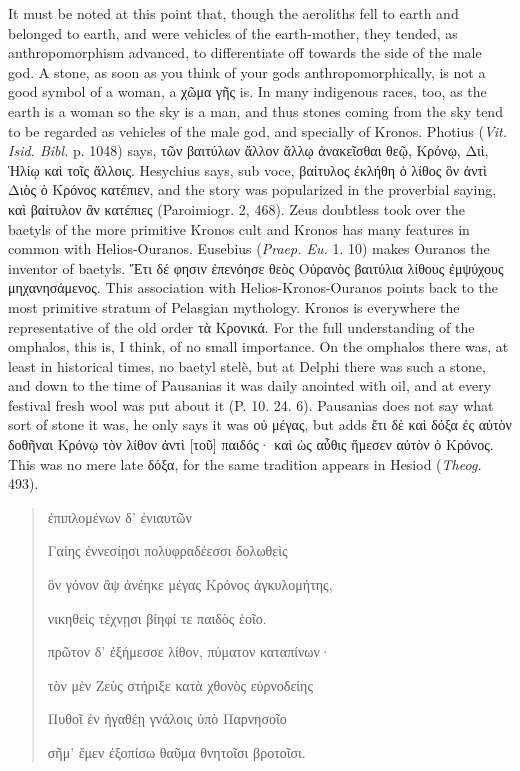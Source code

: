 \documentclass[a4paper, 11pt, oneside, polutonikogreek, english]{article}
\begin{document}
It must be noted at this point that, though the aeroliths fell to earth and belonged to earth, and were vehicles of the earth-mother, they tended, as anthropomorphism advanced, to differentiate off towards the side of the male god. A stone, as soon as you think of your gods anthropomorphically, is not a good symbol of a woman, a χῶμα γῆς is. In many indigenous races, too, as the earth is a woman so the sky is a man, and thus stones coming from the sky tend to be regarded as vehicles of the male god, and specially of Kronos. Photius (\emph{Vit. Isid. Bibl.} p. 1048) says, τῶν βαιτύλων ἄλλον ἄλλῳ ἀνακεῖσθαι θεῷ, Κρόνῳ, Διὶ, Ἡλίῳ καὶ τοῖς ἄλλοις. Hesychius says, sub voce, βαίτυλος ἐκλήθη ὁ λίθος ὃν ἀντὶ Διὸς ὁ Κρόνος κατέπιεν, and the story was popularized in the proverbial saying, καὶ βαίτυλον ἂν κατέπιες (Paroimiogr. 2, 468). Zeus doubtless took over the baetyls of the more primitive Kronos cult and Kronos has many features in common with Helios-Ouranos. Eusebius (\emph{Praep. Eu.} 1. 10) makes Ouranos the inventor of baetyls. Ἔτι δέ φησιν ἐπενόησε θεὸς Οὐρανὸς βαιτύλια λίθους ἐμψύχους μηχανησάμενος. This association with Helios-Kronos-Ouranos points back to the most primitive stratum of Pelasgian mythology. Kronos is everywhere the representative of the old order τὰ Κρονικά. For the full understanding of the omphalos, this is, I think, of no small importance. On the omphalos there was, at least in historical times, no baetyl stelè, but at Delphi there was such a stone, and down to the time of Pausanias it was daily anointed with oil, and at every festival fresh wool was put about it (P. 10. 24. 6). Pausanias does not say what sort of stone it was, he only says it was οὐ μέγας, but adds ἔτι δὲ καὶ δόξα ἐς αὐτὸν δοθῆναι Κρόνῳ τὸν λίθον ἀντὶ [τοῦ] παιδός· καὶ ὡς αὖθις ἥμεσεν αὐτὸν ὁ Κρόνος. This was no mere late δόξα, for the same tradition appears in Hesiod (\emph{Theog.} 493).
\begin{quotation}
\large
\hspace*{15mm}ἐπιπλομένων δ' ἐνιαυτῶν

Γαίης ἐννεσίῃσι πολυφραδέεσσι δολωθεὶς

ὃν γόνον ἂψ ἀνέηκε μέγας Κρόνος ἀγκυλομήτης,

νικηθεὶς τέχνῃσι βίηφί τε παιδὸς ἑοῖο.

πρῶτον δ' ἐξήμεσσε λίθον, πύματον καταπίνων·

τὸν μὲν Ζεὺς στήριξε κατὰ χθονὸς εὐρνοδείης

Πυθοῖ ἐν ἠγαθέῃ γνάλοις ὑπὸ Παρνησοῖο

σῆμ' ἔμεν ἐξοπίσω θαῦμα θνητοῖσι βροτοῖσι.
\end{quotation}
\end{document}
